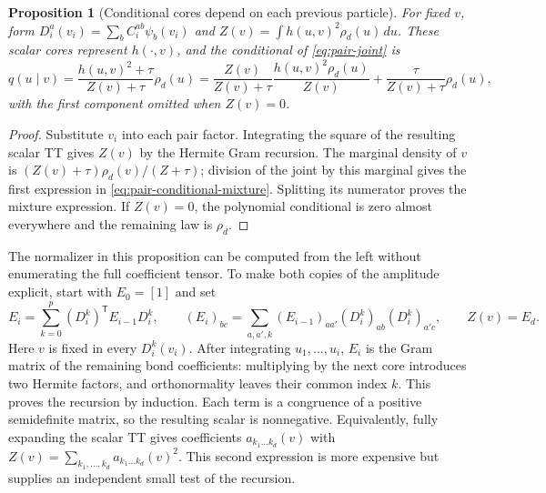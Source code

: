 \documentclass[11pt]{article}
\newtheorem{proposition}{Proposition}
\begin{document}
\begin{proposition}[Conditional cores depend on each previous particle]
\label{prop:pair-conditional}
For fixed $v$, form $D_i^a(v_i)=\sum_bC_i^{ab}\psi_b(v_i)$ and
$Z(v)=\int h(u,v)^2\rho_d(u)\,du$. These scalar cores represent $h(\cdot,v)$,
and the conditional of \eqref{eq:pair-joint} is
\begin{equation}
 q(u\mid v)=\frac{h(u,v)^2+\tau}{Z(v)+\tau}\rho_d(u)
 =\frac{Z(v)}{Z(v)+\tau}\frac{h(u,v)^2\rho_d(u)}{Z(v)}
 +\frac{\tau}{Z(v)+\tau}\rho_d(u),
 \label{eq:pair-conditional-mixture}
\end{equation}
with the first component omitted when $Z(v)=0$.
\end{proposition}
\begin{proof}
Substitute $v_i$ into each pair factor. Integrating the square of the resulting
scalar TT gives $Z(v)$ by the Hermite Gram recursion. The marginal density of
$v$ is $(Z(v)+\tau)\rho_d(v)/(Z+\tau)$; division of the joint by this marginal
gives the first expression in \eqref{eq:pair-conditional-mixture}. Splitting
its numerator proves the mixture expression. If $Z(v)=0$, the polynomial
conditional is zero almost everywhere and the remaining law is $\rho_d$.
\end{proof}

The normalizer in this proposition can be computed from the left without
enumerating the full coefficient tensor. To make both copies of the amplitude
explicit, start with $E_0=[1]$ and set
\begin{equation}
 E_i=\sum_{k=0}^p (D_i^k)^{\mathsf T}E_{i-1}D_i^k,\qquad
 (E_i)_{bc}=\sum_{a,a',k}(E_{i-1})_{aa'}
                 (D_i^k)_{ab}(D_i^k)_{a'c},\qquad Z(v)=E_d.
 \label{eq:pair-forward-gram}
\end{equation}
Here $v$ is fixed in every $D_i^k(v_i)$. After integrating $u_1,\ldots,u_i$,
$E_i$ is the Gram matrix of the remaining bond coefficients: multiplying by
the next core introduces two Hermite factors, and orthonormality leaves their
common index $k$. This proves the recursion by induction. Each term is a
congruence of a positive semidefinite matrix, so the resulting scalar is
nonnegative. Equivalently, fully expanding the scalar TT gives coefficients
$a_{k_1\ldots k_d}(v)$ with
$Z(v)=\sum_{k_1,\ldots,k_d}a_{k_1\ldots k_d}(v)^2$.
This second expression is more expensive but supplies an independent small
test of the recursion.
\end{document}
